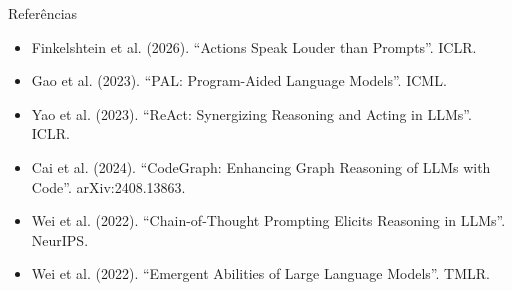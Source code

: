 \documentclass{beamer}
\begin{document}
\begin{frame}{Referências}
  \footnotesize
  \begin{itemize}
    \item Finkelshtein et al. (2026). ``Actions Speak Louder than Prompts''. ICLR.
    \item Gao et al. (2023). ``PAL: Program-Aided Language Models''. ICML.
    \item Yao et al. (2023). ``ReAct: Synergizing Reasoning and Acting in LLMs''. ICLR.
    \item Cai et al. (2024). ``CodeGraph: Enhancing Graph Reasoning of LLMs with Code''. arXiv:2408.13863.
    \item Wei et al. (2022). ``Chain-of-Thought Prompting Elicits Reasoning in LLMs''. NeurIPS.
    \item Wei et al. (2022). ``Emergent Abilities of Large Language Models''. TMLR.
  \end{itemize}
\end{frame}

\backmatter
\end{document}
